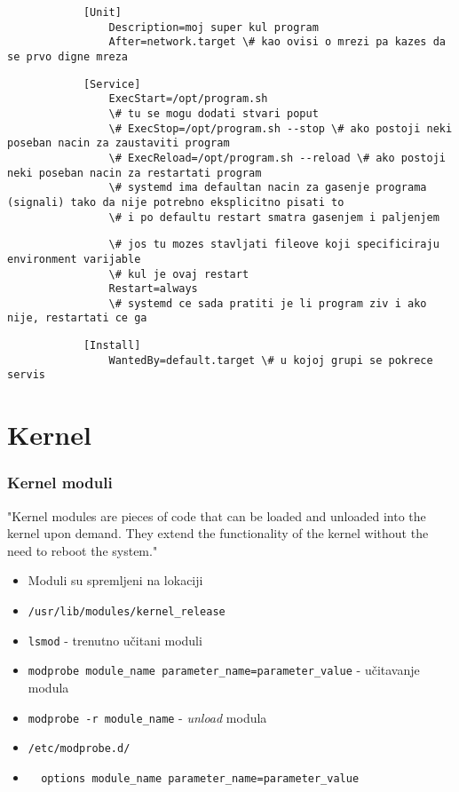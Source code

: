 \documentclass[t]{beamer}
\begin{document}
\begin{frame}[fragile]
	\footnotesize
	\begin{verbatim}
			[Unit]
				Description=moj super kul program
				After=network.target \# kao ovisi o mrezi pa kazes da se prvo digne mreza
	\end{verbatim}
	\begin{verbatim}
			[Service]
				ExecStart=/opt/program.sh
				\# tu se mogu dodati stvari poput
				\# ExecStop=/opt/program.sh --stop \# ako postoji neki poseban nacin za zaustaviti program
				\# ExecReload=/opt/program.sh --reload \# ako postoji neki poseban nacin za restartati program
				\# systemd ima defaultan nacin za gasenje programa (signali) tako da nije potrebno eksplicitno pisati to
				\# i po defaultu restart smatra gasenjem i paljenjem
	\end{verbatim}
	\begin{verbatim}
				\# jos tu mozes stavljati fileove koji specificiraju environment varijable
				\# kul je ovaj restart
				Restart=always
				\# systemd ce sada pratiti je li program ziv i ako nije, restartati ce ga
	\end{verbatim}
	\begin{verbatim}
			[Install]
				WantedBy=default.target \# u kojoj grupi se pokrece servis
	\end{verbatim}
\end{frame}


\section{Kernel}
\begin{frame}[fragile]
	\frametitle{Kernel moduli}
	"Kernel modules are pieces of code that can be loaded and unloaded into the kernel upon demand. They extend the functionality of the kernel without the need to reboot the system."
	\begin{itemize}
		\item Moduli su spremljeni na lokaciji
		\item[] \verb|/usr/lib/modules/kernel_release|
	\end{itemize}
	\begin{itemize}
		\item \texttt{lsmod} - trenutno učitani moduli
		\item \texttt{modprobe module\_name parameter\_name=parameter\_value} - učitavanje modula
		\item \texttt{modprobe -r module\_name} - \textit{unload} modula
	\end{itemize}
	\begin{itemize}
		\item[] \verb|/etc/modprobe.d/|
		\item[] \verb|  options module_name parameter_name=parameter_value|
	\end{itemize}
\end{frame}
\end{document}
